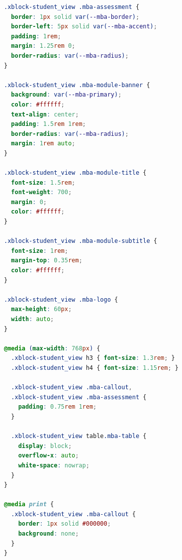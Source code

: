 \begin{lstlisting}[language=CSS]
.xblock-student_view .mba-assessment {
  border: 1px solid var(--mba-border);
  border-left: 5px solid var(--mba-accent);
  padding: 1rem;
  margin: 1.25rem 0;
  border-radius: var(--mba-radius);
}

.xblock-student_view .mba-module-banner {
  background: var(--mba-primary);
  color: #ffffff;
  text-align: center;
  padding: 1.5rem 1rem;
  border-radius: var(--mba-radius);
  margin: 1rem auto;
}

.xblock-student_view .mba-module-title {
  font-size: 1.5rem;
  font-weight: 700;
  margin: 0;
  color: #ffffff;
}

.xblock-student_view .mba-module-subtitle {
  font-size: 1rem;
  margin-top: 0.35rem;
  color: #ffffff;
}

.xblock-student_view .mba-logo {
  max-height: 60px;
  width: auto;
}

@media (max-width: 768px) {
  .xblock-student_view h3 { font-size: 1.3rem; }
  .xblock-student_view h4 { font-size: 1.15rem; }

  .xblock-student_view .mba-callout,
  .xblock-student_view .mba-assessment {
    padding: 0.75rem 1rem;
  }

  .xblock-student_view table.mba-table {
    display: block;
    overflow-x: auto;
    white-space: nowrap;
  }
}

@media print {
  .xblock-student_view .mba-callout {
    border: 1px solid #000000;
    background: none;
  }
}
\end{lstlisting}